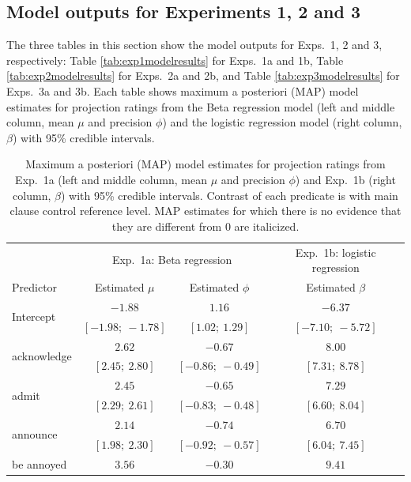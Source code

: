 \documentclass[11pt,fleqn]{article}
\newcommand{\6}{\mbox{$[\hspace*{-.6mm}[$}}
\newcommand{\9}{\mbox{$]\hspace*{-.6mm}]$}}
\begin{document}
\subsection{Model outputs for Experiments 1, 2 and 3}\label{a-mo}

The three tables in this section show the model outputs for Exps.~1, 2 and 3, respectively: Table \ref{tab:exp1modelresults} for Exps.~1a and 1b, Table \ref{tab:exp2modelresults} for Exps.~2a and 2b, and Table \ref{tab:exp3modelresults} for Exps.~3a and 3b. Each table shows maximum a posteriori (MAP) model estimates for projection ratings from the Beta regression model (left and middle column, mean $\mu$ and precision $\phi$) and the logistic regression model (right column, $\beta$)  with 95\% credible intervals.

\begin{table}
\caption{Maximum a posteriori (MAP) model estimates for projection ratings from Exp.~1a (left and middle column, mean $\mu$ and precision $\phi$) and Exp.~1b (right column, $\beta$)  with 95\% credible intervals. Contrast of each predicate is with main clause control reference level. MAP estimates for which there is no evidence that they are different from 0 are italicized.}
\small
\begin{center}
\begin{tabular}{l c c c}
\toprule
& \multicolumn{2}{c}{Exp.~1a: Beta regression} & Exp.~1b: logistic regression \\
Predictor & Estimated $\mu$ & Estimated $\phi$ & Estimated $\beta$\\
\midrule
\multirow{2}{*}{Intercept} & $-1.88 $  & $1.16 $ & $-6.37 $       \\
& $[-1.98;\ -1.78]$ & $[1.02;\ 1.29]$  & $[-7.10;\ -5.72]$ \\
[.25em]
\multirow{2}{*}{acknowledge} & $2.62 $ & $-0.67 $  & $8.00 $        \\
& $[2.45;\ 2.80]$  & $[-0.86;\ -0.49]$ & $[7.31;\ 8.78]$   \\
[.25em]
\multirow{2}{*}{admit} & $2.45 $ & $-0.65 $  & $7.29 $        \\
& $[2.29;\ 2.61]$  & $[-0.83;\ -0.48]$ & $[6.60;\ 8.04]$   \\
[.25em]
\multirow{2}{*}{announce}  & $2.14 $ & $-0.74 $  & $6.70 $        \\
& $[1.98;\ 2.30]$  & $[-0.92;\ -0.57]$ & $[6.04;\ 7.45]$   \\
[.25em]
\multirow{2}{*}{be annoyed} & $3.56 $ & $-0.30 $  & $9.41 $        \\

\end{tabular}
\end{center}
\end{table}
\end{document}
